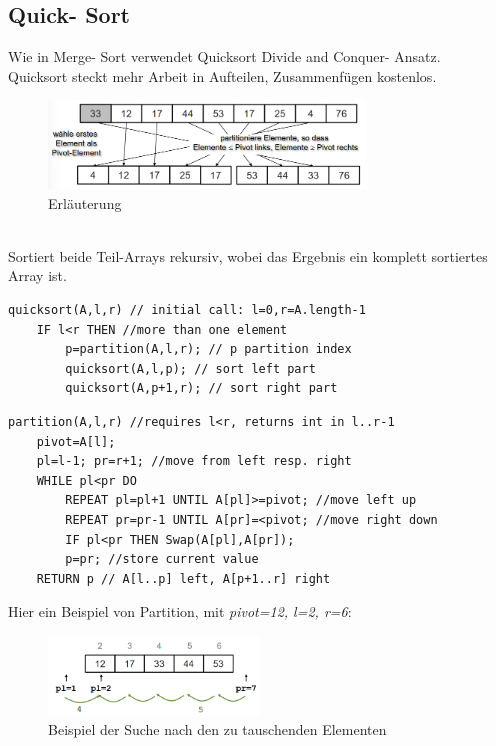 \documentclass{article}
\begin{document}
        \subsection{Quick- Sort}
            Wie in Merge- Sort verwendet Quicksort Divide and Conquer- Ansatz. \\
            Quicksort steckt mehr Arbeit in Aufteilen, Zusammenfügen kostenlos.\\
            \begin{figure}[ht]
                \centering
                \includegraphics[width=0.75\textwidth]{Bilder/QuickSort.png}
                \caption{Erläuterung}
                \label{fig:QuickSort}
            \end{figure}\\
            Sortiert beide Teil-Arrays rekursiv, wobei das Ergebnis ein komplett sortiertes Array ist.\\
            \begin{lstlisting}[style=pseudocode]
quicksort(A,l,r) // initial call: l=0,r=A.length-1
    IF l<r THEN //more than one element
        p=partition(A,l,r); // p partition index
        quicksort(A,l,p); // sort left part
        quicksort(A,p+1,r); // sort right part
            \end{lstlisting}
            \begin{lstlisting}[style=pseudocode]
partition(A,l,r) //requires l<r, returns int in l..r-1
    pivot=A[l];
    pl=l-1; pr=r+1; //move from left resp. right
    WHILE pl<pr DO
        REPEAT pl=pl+1 UNTIL A[pl]>=pivot; //move left up
        REPEAT pr=pr-1 UNTIL A[pr]=<pivot; //move right down
        IF pl<pr THEN Swap(A[pl],A[pr]);
        p=pr; //store current value
    RETURN p // A[l..p] left, A[p+1..r] right
            \end{lstlisting}
            Hier ein Beispiel von Partition, mit \textit{pivot=12, l=2, r=6}:\\
            \begin{figure}[ht]
                \centering
                \includegraphics[width=0.5\textwidth]{Bilder/Partition1.png}
                \caption{Beispiel der Suche nach den zu tauschenden Elementen}
                \label{fig:Partition1}
            \end{figure}\\
\end{document}
